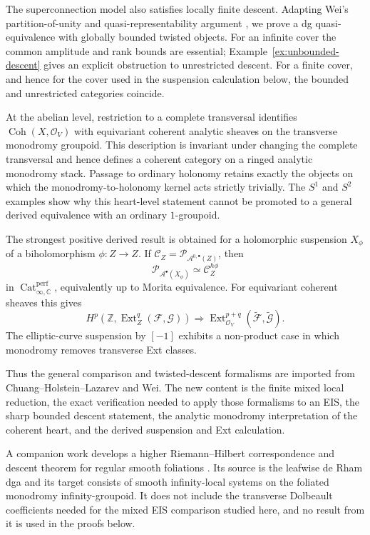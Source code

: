 \documentclass[12pt]{amsart}
\theoremstyle{definition}
\theoremstyle{remark}
\numberwithin{equation}{section}
\newcommand{\CA}{\mathcal A}
\newcommand{\CO}{\mathcal O}
\newcommand{\C}{\mathbb C}
\begin{document}
The superconnection model also satisfies locally finite descent.  Adapting
Wei's partition-of-unity and quasi-representability argument
\cite{Wei2023}, we prove a dg quasi-equivalence with globally bounded twisted
objects.  For an infinite cover the common amplitude and rank bounds are
essential; Example~\ref{ex:unbounded-descent} gives an explicit obstruction
to unrestricted descent.  For a finite cover, and hence for the cover used
in the suspension calculation below, the bounded and unrestricted
categories coincide.

At the abelian level, restriction to a complete transversal identifies
\(\operatorname{Coh}(X,\CO_V)\) with equivariant coherent analytic sheaves
on the transverse monodromy groupoid.  This description is invariant under
changing the complete transversal and hence defines a coherent category on
a ringed analytic monodromy stack.  Passage to ordinary holonomy retains
exactly the objects on which the monodromy-to-holonomy kernel acts strictly
trivially.  The \(S^1\) and \(S^2\) examples show why this heart-level
statement cannot be promoted to a general derived equivalence with an
ordinary \(1\)-groupoid.

The strongest positive derived result is obtained for a holomorphic
suspension \(X_\phi\) of a biholomorphism \(\phi:Z\to Z\).  If
\(\mathcal C_Z=\mathcal P_{\CA^{0,\bullet}(Z)}\), then
\[
\mathcal P_{\CA^\bullet(X_\phi)}
\simeq
\mathcal C_Z^{h\phi}
\]
in \(\operatorname{Cat}^{\mathrm{perf}}_{\infty,\C}\), equivalently up to
Morita equivalence.  For equivariant coherent sheaves this gives
\[
H^p\!\left(\mathbb Z,
\operatorname{Ext}_Z^q(\mathcal F,\mathcal G)\right)
\Longrightarrow
\operatorname{Ext}_{\CO_V}^{p+q}
(\widetilde{\mathcal F},\widetilde{\mathcal G}).
\]
The elliptic-curve suspension by \([-1]\) exhibits a non-product case in
which monodromy removes transverse Ext classes.

Thus the general comparison and twisted-descent formalisms are imported
from Chuang--Holstein--Lazarev and Wei.  The new content is the finite mixed
local reduction, the exact verification needed to apply those formalisms to
an EIS, the sharp bounded descent statement, the analytic monodromy
interpretation of the coherent heart, and the derived suspension and Ext
calculation.

A companion work develops a higher Riemann--Hilbert correspondence and
descent theorem for regular smooth foliations
\cite{ZengHigherRH}.  Its source is the leafwise de Rham dga and its target
consists of smooth infinity-local systems on the foliated monodromy
infinity-groupoid.  It does not include the transverse Dolbeault
coefficients needed for the mixed EIS comparison studied here, and no result
from it is used in the proofs below.
\end{document}
